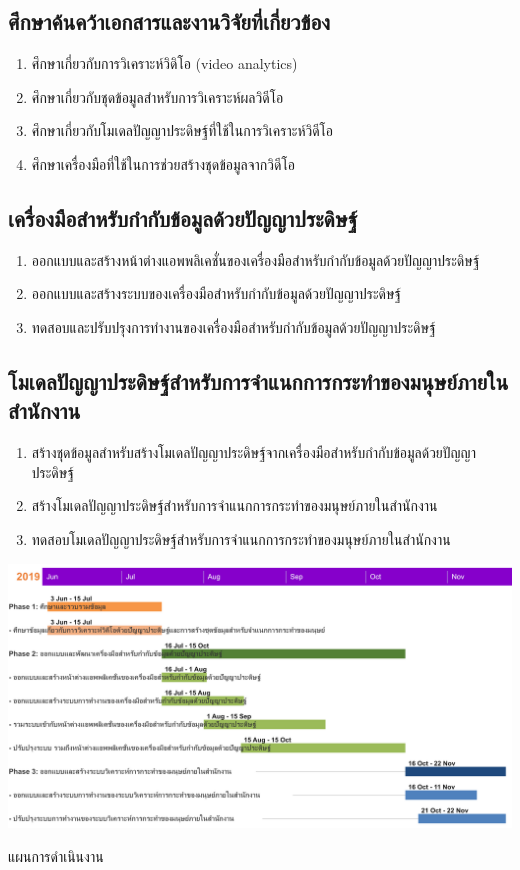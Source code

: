 \subsection*{ศึกษาค้นคว้าเอกสารและงานวิจัยที่เกี่ยวข้อง}
\begin{enumerate}\setlength\itemsep{-0.25em}
	\item ศึกษาเกี่ยวกับการวิเคราะห์วิดิโอ (video analytics)
	\item ศึกษาเกี่ยวกับชุดข้อมูลสำหรับการวิเคราะห์ผลวิดีโอ
	\item ศึกษาเกี่ยวกับโมเดลปัญญาประดิษฐ์ที่ใช้ในการวิเคราะห์วิดีโอ
	\item ศึกษาเครื่องมือที่ใช้ในการช่วยสร้างชุดข้อมูลจากวิดีโอ
\end{enumerate}
\subsection*{เครื่องมือสำหรับกำกับข้อมูลด้วยปัญญาประดิษฐ์}
\begin{enumerate}\setlength\itemsep{-0.25em}
	\item ออกแบบและสร้างหน้าต่างแอพพลิเคชั่นของเครื่องมือสำหรับกำกับข้อมูลด้วยปัญญาประดิษฐ์
	\item ออกแบบและสร้างระบบของเครื่องมือสำหรับกำกับข้อมูลด้วยปัญญาประดิษฐ์
	\item ทดสอบและปรับปรุงการทำงานของเครื่องมือสำหรับกำกับข้อมูลด้วยปัญญาประดิษฐ์
\end{enumerate}
\subsection*{โมเดลปัญญาประดิษฐ์สำหรับการจำแนกการกระทำของมนุษย์ภายในสำนักงาน}
\begin{enumerate}\setlength\itemsep{-0.25em}
	\item สร้างชุดข้อมูลสำหรับสร้างโมเดลปัญญาประดิษฐ์จากเครื่องมือสำหรับกำกับข้อมูลด้วยปัญญาประดิษฐ์
	\item สร้างโมเดลปัญญาประดิษฐ์สำหรับการจำแนกการกระทำของมนุษย์ภายในสำนักงาน
	\item ทดสอบโมเดลปัญญาประดิษฐ์สำหรับการจำแนกการกระทำของมนุษย์ภายในสำนักงาน
\end{enumerate}
\clearpage

\begin{table}[!ht]
	\includegraphics[width=1.125\textwidth]{chapter1/ganttchart.png}
	\caption{แผนการดำเนินงาน}
	\label{tab:ganttchart}
\end{table}
\clearpage